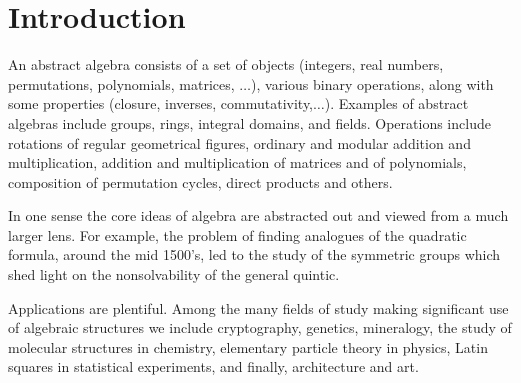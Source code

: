 \documentclass[12pt]{book}
\theoremstyle{definition}
\begin{document}
\pagestyle{plain}





 \thispagestyle{empty}
 


\clearpage
\setcounter{tocdepth}{1}



\tableofcontents
\cleardoublepage
{}

\pagestyle{fancy}

\section*{Introduction}
An abstract algebra consists of a set of objects (integers, real numbers, permutations, polynomials, matrices, $\dots$), various binary operations, along with some properties (closure, inverses, commutativity,$\dots$). Examples of abstract algebras include groups, rings, integral domains, and fields. Operations include rotations of regular geometrical figures, ordinary and modular addition and multiplication, addition and multiplication of matrices and of polynomials, composition of permutation cycles, direct products and others.

In one sense the core ideas of algebra are abstracted out and viewed from a much larger lens. For example, the problem of finding analogues of the quadratic formula, around the mid 1500’s, led to the study of the symmetric groups which shed light on the nonsolvability of the general quintic.

Applications are plentiful. Among the many fields of study making significant use of algebraic structures we include cryptography, genetics, mineralogy, the study of molecular structures in chemistry, elementary particle theory in physics, Latin squares in statistical experiments, and finally, architecture and art.
\end{document}
